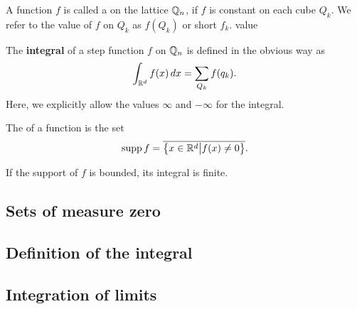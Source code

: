 \begin{definition}
  A function $f$ is called a  on the lattice
  $\mathbb Q_n$, if $f$ is constant on each cube $Q_k$. We refer to the value
  of $f$ on $Q_k$ as $f(Q_k)$ or short $f_k$.
  value 
\end{definition}

\begin{definition}
  The \textbf{integral} of a step function $f$ on $\mathbb Q_n$ is
  defined in the obvious way as
  \begin{gather*}
    \int_{\mathbb R^d} f(x) \,dx = \sum_{Q_k} f(q_k). 
  \end{gather*}
  Here, we explicitly allow the values $\infty$ and $-\infty$ for the integral.
\end{definition}

\begin{definition}
  The  of a function is the set
  \begin{gather}
    \operatorname{supp} f = \overline{
      \bigl\{x\in \mathbb R^d\big| f(x) \neq 0 \bigr\}}.
  \end{gather}
\end{definition}
\begin{note}
  If the support of $f$ is bounded, its integral is finite.
\end{note}

\subsection{Sets of measure zero}

\subsection{Definition of the integral}

\subsection{Integration of limits}

